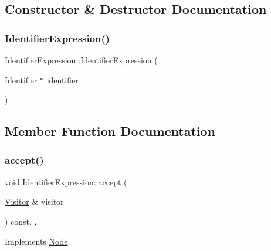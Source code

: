 \subsection{Constructor \& Destructor Documentation}
\mbox{\label{struct_identifier_expression_a187a16250972ed7afdd1cfc1972cffa8}} 
\subsubsection{\texorpdfstring{Identifier\+Expression()}{IdentifierExpression()}}
{\footnotesize\ttfamily Identifier\+Expression\+::\+Identifier\+Expression (\begin{DoxyParamCaption}\item[{\hyperlink{struct_identifier}{Identifier} $\ast$}]{identifier }\end{DoxyParamCaption})\hspace{0.3cm}{\ttfamily [inline]}}



\subsection{Member Function Documentation}
\mbox{\label{struct_identifier_expression_a95666fc6c9f12f7beec4db0131beadf8}} 
\subsubsection{\texorpdfstring{accept()}{accept()}}
{\footnotesize\ttfamily void Identifier\+Expression\+::accept (\begin{DoxyParamCaption}\item[{\hyperlink{struct_visitor}{Visitor} \&}]{visitor }\end{DoxyParamCaption}) const\hspace{0.3cm}{\ttfamily [inline]}, {\ttfamily [override]}, {\ttfamily [virtual]}}



Implements \hyperlink{struct_node_a10bd7af968140bbf5fa461298a969c71}{Node}.

